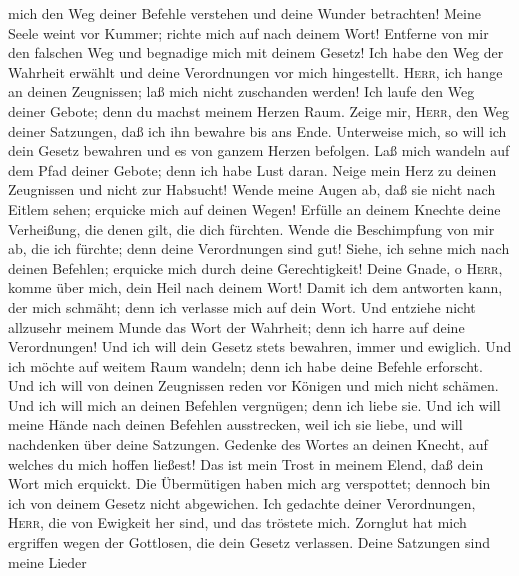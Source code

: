 mich den Weg deiner Befehle verstehen und deine Wunder betrachten!
 Meine Seele weint vor Kummer; richte mich auf nach
deinem Wort!  Entferne von mir den falschen Weg und
begnadige mich mit deinem Gesetz!  Ich habe den Weg der
Wahrheit erwählt und deine Verordnungen vor mich hingestellt.
 \textsc{Herr}, ich hange an deinen Zeugnissen; laß mich
nicht zuschanden werden!  Ich laufe den Weg deiner
Gebote; denn du machst meinem Herzen Raum.  Zeige mir,
\textsc{Herr}, den Weg deiner Satzungen, daß ich ihn bewahre bis ans
Ende.  Unterweise mich, so will ich dein Gesetz bewahren
und es von ganzem Herzen befolgen.  Laß mich wandeln auf
dem Pfad deiner Gebote; denn ich habe Lust daran.  Neige
mein Herz zu deinen Zeugnissen und nicht zur Habsucht! 
Wende meine Augen ab, daß sie nicht nach Eitlem sehen; erquicke mich auf
deinen Wegen!  Erfülle an deinem Knechte deine
Verheißung, die denen gilt, die dich fürchten.  Wende die
Beschimpfung von mir ab, die ich fürchte; denn deine Verordnungen sind
gut!  Siehe, ich sehne mich nach deinen Befehlen;
erquicke mich durch deine Gerechtigkeit!  Deine Gnade, o
\textsc{Herr}, komme über mich, dein Heil nach deinem Wort!
 Damit ich dem antworten kann, der mich schmäht; denn ich
verlasse mich auf dein Wort.  Und entziehe nicht
allzusehr meinem Munde das Wort der Wahrheit; denn ich harre auf deine
Verordnungen!  Und ich will dein Gesetz stets bewahren,
immer und ewiglich.  Und ich möchte auf weitem Raum
wandeln; denn ich habe deine Befehle erforscht.  Und ich
will von deinen Zeugnissen reden vor Königen und mich nicht schämen.
 Und ich will mich an deinen Befehlen vergnügen; denn ich
liebe sie.  Und ich will meine Hände nach deinen Befehlen
ausstrecken, weil ich sie liebe, und will nachdenken über deine
Satzungen.  Gedenke des Wortes an deinen Knecht, auf
welches du mich hoffen ließest!  Das ist mein Trost in
meinem Elend, daß dein Wort mich erquickt.  Die
Übermütigen haben mich arg verspottet; dennoch bin ich von deinem Gesetz
nicht abgewichen.  Ich gedachte deiner Verordnungen,
\textsc{Herr}, die von Ewigkeit her sind, und das tröstete mich.
 Zornglut hat mich ergriffen wegen der Gottlosen, die
dein Gesetz verlassen.  Deine Satzungen sind meine Lieder
